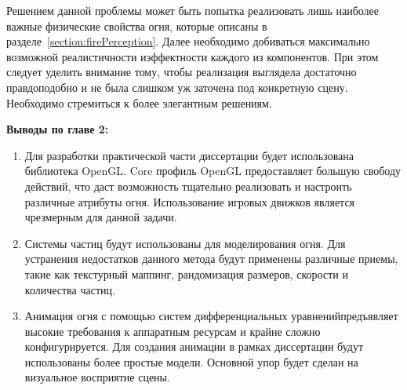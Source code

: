 Решением данной проблемы может быть попытка реализовать лишь наиболее важные
физические свойства огня, которые описаны в
разделе~\ref{section:firePerception}. Далее необходимо добиваться максимально
возможной реалистичности и\break{}эффектности каждого из компонентов. При этом
следует уделить внимание тому, чтобы реализация выглядела достаточно
правдоподобно и не была слишком уж заточена под конкретную сцену. Необходимо
стремиться к более элегантным решениям.

\textbf{Выводы по главе 2:}
\begin{enumerate}
    \item Для разработки практической части диссертации будет использована
        библиотека OpenGL\@. Core профиль OpenGL предоставляет большую
        свободу действий, что даст возможность тщательно реализовать и настроить
        различные атрибуты огня. Использование игровых движков является
        чрезмерным для данной задачи.
    \item Системы частиц будут использованы для моделирования огня. Для
        устранения недостатков данного метода будут применены различные приемы,
        такие как текстурный маппинг, рандомизация размеров, скорости и
        количества частиц.
    \item Анимация огня с помощью систем дифференциальных
        уравнений\break{}предъявляет высокие требования к аппаратным ресурсам и
        крайне сложно конфигурируется. Для создания анимации в рамках
        диссертации будут использованы более простые модели. Основной упор будет
        сделан на визуальное восприятие сцены.
\end{enumerate}
